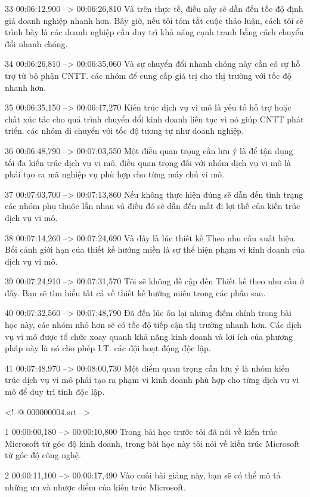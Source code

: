 33
00:06:12,900 --> 00:06:26,810
Và trên thực tế, điều này sẽ dẫn đến tốc độ định giá doanh nghiệp nhanh hơn.  Bây giờ, nếu tôi tóm tắt cuộc thảo luận, cách tôi sẽ trình bày là các doanh nghiệp cần duy trì khả năng cạnh tranh bằng cách chuyển đổi nhanh chóng.

34
00:06:26,810 --> 00:06:35,060
Và sự chuyển đổi nhanh chóng này cần có sự hỗ trợ từ bộ phận CNTT.  các nhóm để cung cấp giá trị cho thị trường với tốc độ nhanh hơn.

35
00:06:35,150 --> 00:06:47,270
Kiến trúc dịch vụ vi mô là yếu tố hỗ trợ hoặc chất xúc tác cho quá trình chuyển đổi kinh doanh liên tục vì nó giúp CNTT phát triển.  các nhóm di chuyển với tốc độ tương tự như doanh nghiệp.

36
00:06:48,790 --> 00:07:03,550
Một điều quan trọng cần lưu ý là để tận dụng tối đa kiến ​​trúc dịch vụ vi mô, điều quan trọng đối với nhóm dịch vụ vi mô là phải tạo ra mã nghiệp vụ phù hợp cho từng máy chủ vi mô.

37
00:07:03,700 --> 00:07:13,860
Nếu không thực hiện đúng sẽ dẫn đến tình trạng các nhóm phụ thuộc lẫn nhau và điều đó sẽ dẫn đến mất đi lợi thế của kiến ​​trúc dịch vụ vi mô.

38
00:07:14,260 --> 00:07:24,690
Và đây là lúc thiết kế Theo nhu cầu xuất hiện.  Bối cảnh giới hạn của thiết kế hướng miền là sự thể hiện phạm vi kinh doanh của dịch vụ vi mô.

39
00:07:24,910 --> 00:07:31,570
Tôi sẽ không đề cập đến Thiết kế theo nhu cầu ở đây.  Bạn sẽ tìm hiểu tất cả về thiết kế hướng miền trong các phần sau.

40
00:07:32,560 --> 00:07:48,790
Đã đến lúc ôn lại những điểm chính trong bài học này, các nhóm nhỏ hơn sẽ có tốc độ tiếp cận thị trường nhanh hơn.  Các dịch vụ vi mô được tổ chức xoay quanh khả năng kinh doanh và lợi ích của phương pháp này là nó cho phép I.T.  các đội hoạt động độc lập.

41
00:07:48,970 --> 00:08:00,730
Một điểm quan trọng cần lưu ý là nhóm kiến ​​trúc dịch vụ vi mô phải tạo ra phạm vi kinh doanh phù hợp cho từng dịch vụ vi mô để duy trì tính độc lập.

<!--@ 000000004.srt -->

1
00:00:00,180 --> 00:00:10,800
Trong bài học trước tôi đã nói về kiến ​​trúc Microsoft từ góc độ kinh doanh, trong bài học này tôi nói về kiến ​​trúc Microsoft từ góc độ công nghệ.

2
00:00:11,100 --> 00:00:17,490
Vào cuối bài giảng này, bạn sẽ có thể mô tả những ưu và nhược điểm của kiến ​​trúc Microsoft.

